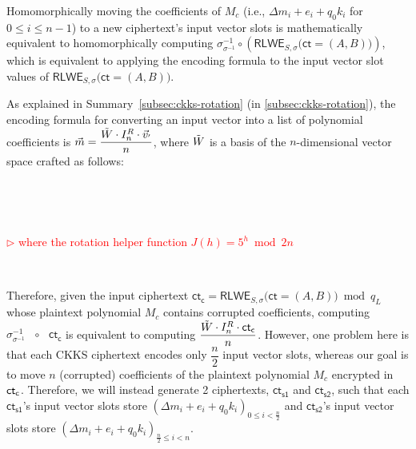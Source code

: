 Homomorphically moving the coefficients of $M_c$ (i.e., $\Delta m_i + e_i + q_0k_i$ for $0 \leq i \leq n - 1$) to a new ciphertext's input vector slots is mathematically equivalent to homomorphically computing $\sigma^{-1}_{\sigma^{-1}} \circ (\textsf{RLWE}_{S, \sigma}\bm{(}\textsf{ct} = (A, B)\bm))$, which is equivalent to applying the encoding formula to the input vector slot values of $\textsf{RLWE}_{S, \sigma}\bm{(}\textsf{ct} = (A, B)\bm)$. 



As explained in Summary~\ref*{subsec:ckks-rotation} (in \autoref{subsec:ckks-rotation}), the encoding formula for converting an input vector into a list of polynomial coefficients is $\vec{m} = \dfrac{\tilde W \cdot I_n^R \cdot \vec{v}_{'}}{n}$, where $\tilde W$ is a basis of the $n$-dimensional vector space crafted as follows: 

$ $


$ $

\textcolor{red}{ $\rhd$ where the rotation helper function $J(h) = 5^h \bmod 2n$}

$ $

Therefore, given the input ciphertext $\textsf{ct}_{\textsf{c}} = \textsf{RLWE}_{S, \sigma}\bm{(}\textsf{ct} = (A, B)\bm) \bmod q_L$ whose plaintext polynomial $M_c$ contains corrupted coefficients, computing $\sigma^{-1}_{\sigma^{-1}} \text{ } \circ \text{ } \textsf{ct}_{\textsf{c}}$ is equivalent to computing $\dfrac{\tilde W \cdot I_n^R \cdot \textsf{ct\textsubscript{c}}}{n}$. However, one problem here is that each CKKS ciphertext encodes only $\dfrac{n}{2}$ input vector slots, whereas our goal is to move $n$ (corrupted) coefficients of the plaintext polynomial $M_c$ encrypted in $\textsf{ct\textsubscript{c}}$. Therefore, we will instead generate 2 ciphertexts, $\textsf{ct}_{\textsf{s1}}$ and $\textsf{ct}_{\textsf{s2}}$, such that each $\textsf{ct}_{\textsf{s1}}$'s input vector slots store $(\Delta m_i + e_i + q_0k_i)_{0 \leq i < \frac{n}{2}}$ and $\textsf{ct}_{\textsf{s2}}$'s input vector slots store $(\Delta m_i + e_i + q_0k_i)_{\frac{n}{2} \leq i < n}$. 

